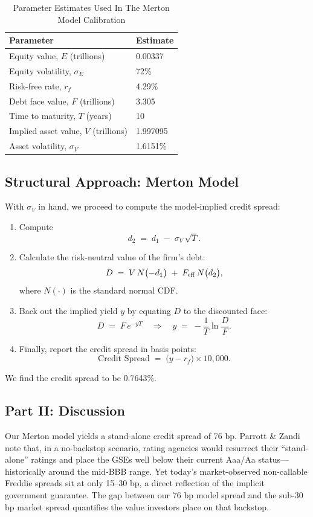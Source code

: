 \documentclass{article}
\begin{document}
\begin{table}[H]
\centering
\begin{tabular}{@{}ll@{}}
\toprule
\textbf{Parameter} & \textbf{Estimate} \\
\midrule
Equity value, $E$ (trillions)            & 0.00337      \\
Equity volatility, $\sigma_E$            & 72\%         \\
Risk-free rate, $r_f$                    & 4.29\%       \\
Debt face value, $F$ (trillions)         & 3.305        \\
Time to maturity, $T$ (years)            & 10           \\
Implied asset value, $V$ (trillions)     & 1.997095     \\
Asset volatility, $\sigma_V$             & 1.6151\%     \\
\bottomrule
\end{tabular}
\caption{Parameter Estimates Used In The Merton Model Calibration}
\label{tab:parameter_estimates}
\end{table}


\subsection{Structural Approach: Merton Model}

With \(\sigma_{V}\) in hand, we proceed to compute the model‐implied credit spread:

\begin{enumerate}
  \item Compute 
  \[
    d_{2} \;=\; d_{1}\;-\;\sigma_{V}\,\sqrt{T}.
  \]
  \item Calculate the risk-neutral value of the firm’s debt:
  \[
    D \;=\;
      V\,N\bigl(-d_{1}\bigr)
    \;+\;
      F_{\rm eff}\,N\bigl(d_{2}\bigr),
  \]
  where \(N(\cdot)\) is the standard normal CDF.
  \item Back out the implied yield \(y\) by equating \(D\) to the discounted face:
  \[
    D \;=\; F\,e^{-yT}
    \quad\Longrightarrow\quad
    y \;=\; -\frac{1}{T}\ln\frac{D}{F}.
  \]
  \item Finally, report the credit spread in basis points:
  \[
    \text{Credit Spread}
    \;=\;
    \bigl(y - r_{f}\bigr)\times 10{,}000.
  \]
\end{enumerate}

We find the credit spread to be 0.7643\%.

\subsection{Part II: Discussion}
Our Merton model yields a stand-alone credit spread of 76 bp. Parrott \& Zandi note that, in a no-backstop scenario, rating agencies would resurrect their “stand-alone” ratings and place the GSEs well below their current Aaa/Aa status—historically around the mid-BBB range. Yet today’s market-observed non-callable Freddie spreads sit at only 15–30 bp, a direct reflection of the implicit government guarantee. The gap between our 76 bp model spread and the sub-30 bp market spread quantifies the value investors place on that backstop. \\
\end{document}
